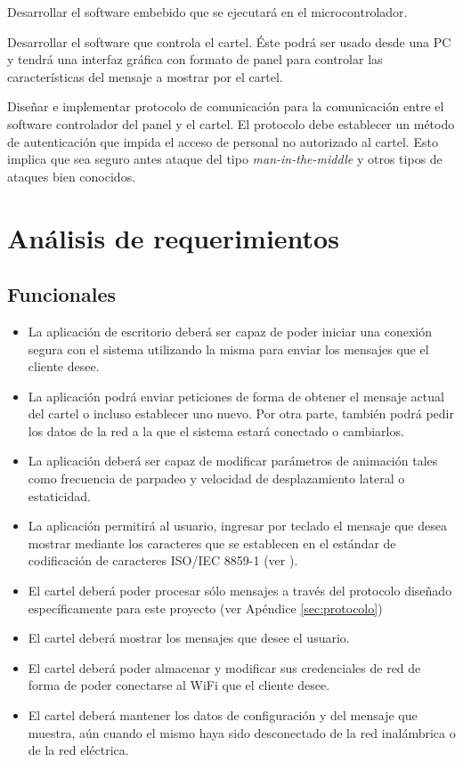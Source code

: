 Desarrollar el software embebido que se ejecutará en el microcontrolador.

Desarrollar el software que controla el cartel. Éste podrá ser usado desde una PC y tendrá una interfaz gráfica con formato de panel para controlar las características del mensaje a mostrar por el cartel.

Diseñar e implementar protocolo de comunicación para la comunicación entre el software controlador del panel y el cartel. El protocolo debe establecer un método de autenticación que impida el acceso de personal no autorizado al cartel. Esto implica que sea seguro antes ataque del tipo \emph{man-in-the-middle} y otros tipos de ataques bien conocidos.

\section{Análisis de requerimientos}

\subsection{Funcionales}
\begin{itemize}
	\item La aplicación de escritorio deberá ser capaz de poder iniciar una conexión segura con el sistema utilizando la misma para enviar los mensajes que el cliente desee.
	\item La aplicación podrá enviar peticiones de forma de obtener el mensaje actual del cartel o incluso establecer uno nuevo. Por otra parte, también podrá pedir los datos de la red a la que el sistema estará conectado o cambiarlos.
	\item La aplicación deberá ser capaz de modificar parámetros de animación tales como frecuencia de parpadeo y velocidad de desplazamiento lateral o estaticidad.
	\item La aplicación permitirá al usuario, ingresar por teclado el mensaje que desea mostrar mediante los caracteres que se establecen en el estándar de codificación de caracteres ISO/IEC 8859-1 (ver \cite{CodifChar}).
	\item El cartel deberá poder procesar sólo mensajes a través del protocolo diseñado específicamente para este proyecto (ver Apéndice \ref{sec:protocolo})
	\item El cartel deberá mostrar los mensajes que desee el usuario.
	\item El cartel deberá poder almacenar y modificar sus credenciales de red de forma de poder conectarse al WiFi que el cliente desee.
	\item El cartel deberá mantener los datos de configuración y del mensaje que muestra, aún cuando el mismo haya sido desconectado de la red inalámbrica o de la red eléctrica.
\end{itemize}

